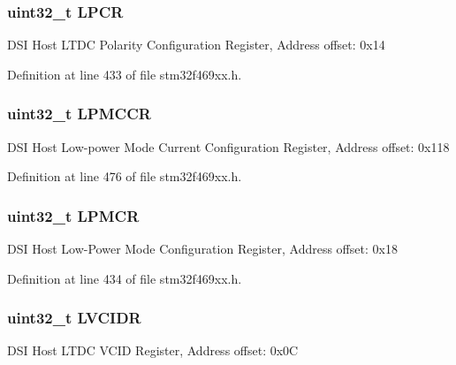 \subsubsection[{\texorpdfstring{L\+P\+CR}{LPCR}}]{ uint32\+\_\+t L\+P\+CR}\hypertarget{struct_d_s_i___type_def_aa88f7acf487a73acd763e8478ac58e7c}{}\label{struct_d_s_i___type_def_aa88f7acf487a73acd763e8478ac58e7c}
D\+SI Host L\+T\+DC Polarity Configuration Register, Address offset\+: 0x14 

Definition at line 433 of file stm32f469xx.\+h.

\subsubsection[{\texorpdfstring{L\+P\+M\+C\+CR}{LPMCCR}}]{ uint32\+\_\+t L\+P\+M\+C\+CR}\hypertarget{struct_d_s_i___type_def_a0779b0195249d52afca2ac232e400d89}{}\label{struct_d_s_i___type_def_a0779b0195249d52afca2ac232e400d89}
D\+SI Host Low-\/power Mode Current Configuration Register, Address offset\+: 0x118 

Definition at line 476 of file stm32f469xx.\+h.

\subsubsection[{\texorpdfstring{L\+P\+M\+CR}{LPMCR}}]{ uint32\+\_\+t L\+P\+M\+CR}\hypertarget{struct_d_s_i___type_def_ad7eabfe197dd4e367c4817b64fc8a207}{}\label{struct_d_s_i___type_def_ad7eabfe197dd4e367c4817b64fc8a207}
D\+SI Host Low-\/\+Power Mode Configuration Register, Address offset\+: 0x18 

Definition at line 434 of file stm32f469xx.\+h.

\subsubsection[{\texorpdfstring{L\+V\+C\+I\+DR}{LVCIDR}}]{ uint32\+\_\+t L\+V\+C\+I\+DR}\hypertarget{struct_d_s_i___type_def_a5aa70d8b857aa2b3fb2b1767eb2b82e0}{}\label{struct_d_s_i___type_def_a5aa70d8b857aa2b3fb2b1767eb2b82e0}
D\+SI Host L\+T\+DC V\+C\+ID Register, Address offset\+: 0x0C 

